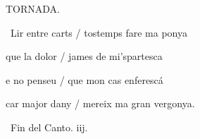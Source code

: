 \documentclass[12pt]{article}
\begin{document}
\begin{estrofaExtra}%




\begin{tornada}

\pagina{[145v]} TORNADA.

\end{tornada}


\end{estrofaExtra}


\begin{estrofa}

 \textparagraph\  Lir entre carts / tostemps fare ma ponya

 que la dolor / james de mi'spartesca

 e no penseu / que mon cas enferesc\'{a}

 car major dany / mereix ma gran vergonya.

\end{estrofa}



\begin{estrofaExtra}%

\begin{final}

\textparagraph\  Fin del Canto. iij.

\end{final}

\end{estrofaExtra}
\end{document}
